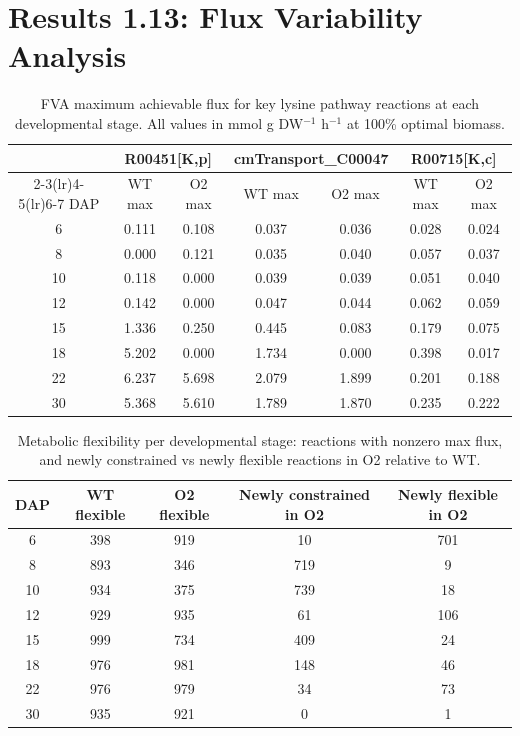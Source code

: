 \documentclass[11pt,letterpaper]{article}
\begin{document}
\clearpage


\section{Results 1.13: Flux Variability Analysis}

\begin{table}[H]
\centering
\caption{FVA maximum achievable flux for key lysine pathway reactions at each developmental stage. All values in mmol g DW$^{-1}$ h$^{-1}$ at 100\% optimal biomass.}
\label{stab:fva_lys}
\small
\begin{tabular}{ccccccc}
\toprule
& \multicolumn{2}{c}{R00451[K,p]} & \multicolumn{2}{c}{cmTransport\_C00047} & \multicolumn{2}{c}{R00715[K,c]} \\
\cmidrule(lr){2-3}\cmidrule(lr){4-5}\cmidrule(lr){6-7}
DAP & WT max & O2 max & WT max & O2 max & WT max & O2 max \\
\midrule
 6  & 0.111 & 0.108 & 0.037 & 0.036 & 0.028 & 0.024 \\
 8  & 0.000 & 0.121 & 0.035 & 0.040 & 0.057 & 0.037 \\
10  & 0.118 & 0.000 & 0.039 & 0.039 & 0.051 & 0.040 \\
12  & 0.142 & 0.000 & 0.047 & 0.044 & 0.062 & 0.059 \\
15  & 1.336 & 0.250 & 0.445 & 0.083 & 0.179 & 0.075 \\
18  & 5.202 & 0.000 & 1.734 & 0.000 & 0.398 & 0.017 \\
22  & 6.237 & 5.698 & 2.079 & 1.899 & 0.201 & 0.188 \\
30  & 5.368 & 5.610 & 1.789 & 1.870 & 0.235 & 0.222 \\
\bottomrule
\end{tabular}
\end{table}

\clearpage

\begin{table}[H]
\centering
\caption{Metabolic flexibility per developmental stage: reactions with nonzero max flux, and newly constrained vs newly flexible reactions in O2 relative to WT.}
\label{stab:fva_flex}
\begin{tabular}{ccccc}
\toprule
DAP & WT flexible & O2 flexible & Newly constrained in O2 & Newly flexible in O2 \\
\midrule
 6  & 398 & 919 &  10 & 701 \\
 8  & 893 & 346 & 719 &   9 \\
10  & 934 & 375 & 739 &  18 \\
12  & 929 & 935 &  61 & 106 \\
15  & 999 & 734 & 409 &  24 \\
18  & 976 & 981 & 148 &  46 \\
22  & 976 & 979 &  34 &  73 \\
30  & 935 & 921 &   0 &   1 \\
\bottomrule
\end{tabular}
\end{table}

\clearpage
\end{document}
